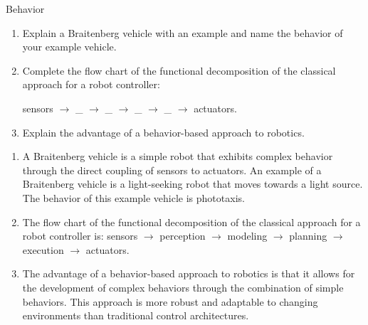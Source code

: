 \documentclass{article}
\begin{document}
\begin{exercise}{Behavior}
  \begin{enumerate}
    \item Explain a Braitenberg vehicle with an example and name the behavior of your example vehicle.
    \item Complete the flow chart of the functional decomposition of the classical approach for a robot controller:
    \begin{center}sensors $\rightarrow$ \_ $\rightarrow$ \_ $\rightarrow$ \_ $\rightarrow$ \_ $\rightarrow$ actuators.\end{center}
    \item Explain the advantage of a behavior-based approach to robotics.
  \end{enumerate}

  \begin{solution}
    \begin{enumerate}
      \item A Braitenberg vehicle is a simple robot that exhibits complex behavior through the direct coupling of sensors to actuators. An example of a Braitenberg vehicle is a light-seeking robot that moves towards a light source. The behavior of this example vehicle is phototaxis.
      \item The flow chart of the functional decomposition of the classical approach for a robot controller is: sensors $\rightarrow$ perception $\rightarrow$ modeling $\rightarrow$ planning $\rightarrow$ execution $\rightarrow$ actuators.
      \item The advantage of a behavior-based approach to robotics is that it allows for the development of complex behaviors through the combination of simple behaviors. This approach is more robust and adaptable to changing environments than traditional control architectures.
    \end{enumerate}
  \end{solution}
\end{exercise}
\end{document}
